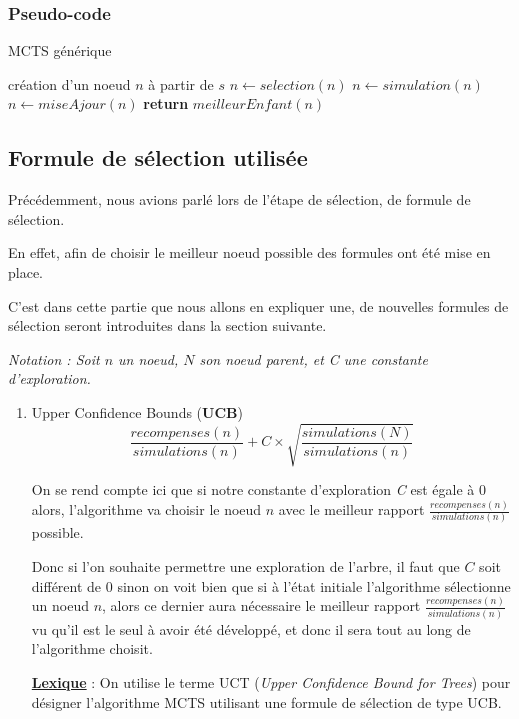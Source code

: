 \documentclass[pdftex,french, english]{article}	%
\begin{document}
	\subsubsection{Pseudo-code}
	\begin{algorithm}
	\caption{MCTS générique}
	  \label{alg:mcts}
	\begin{algorithmic}[1]
	\State création d'un noeud $n$ à partir de $s$
	\State $n \gets selection(n)$ 
	\State $n \gets simulation(n)$
	\State $n \gets miseAjour(n)$
	\EndWhile
	\State \textbf{return} $meilleurEnfant(n)$
	\EndFunction
	\end{algorithmic}
	\end{algorithm}
    
    
    
    
    
	\subsection{Formule de sélection utilisée} \label{selection}
	Précédemment, nous avions parlé lors de l'étape de sélection, de formule de sélection. 

	En effet, afin de choisir le meilleur noeud possible des formules ont été mise en place.

	C'est dans cette partie que nous allons en expliquer une, de nouvelles formules de sélection seront introduites
	dans la section suivante.


	\textit{Notation : Soit $n$ un noeud, $N$ son noeud parent, et C une constante d'exploration.} 

	\begin{enumerate}
		\item Upper Confidence Bounds (\textbf{UCB}) \\
		\[ \frac{recompenses(n)}{simulations(n)} + C \times \sqrt{\frac{simulations(N)}{simulations(n)}} \] 

		On se rend compte ici que si notre constante d'exploration \textit{C} est égale à $0$ alors, l'algorithme va choisir le noeud $n$ avec le meilleur rapport $\frac{recompenses(n)}{simulations(n)}$ possible. 

		Donc si l'on souhaite permettre une exploration de l'arbre, il faut que $C$ soit différent de $0$ sinon on voit bien que si à l'état initiale l'algorithme sélectionne un noeud $n$, alors ce dernier aura nécessaire le meilleur rapport $\frac{recompenses(n)}{simulations(n)}$ vu qu'il est le seul à avoir été développé, et donc il sera tout au long de l'algorithme choisit. 


		\underline{\textbf{Lexique}} : On utilise le terme UCT (\textit{Upper Confidence Bound for Trees}) pour désigner l'algorithme MCTS utilisant une formule de sélection de type UCB.
	\end{enumerate}
\end{document}
